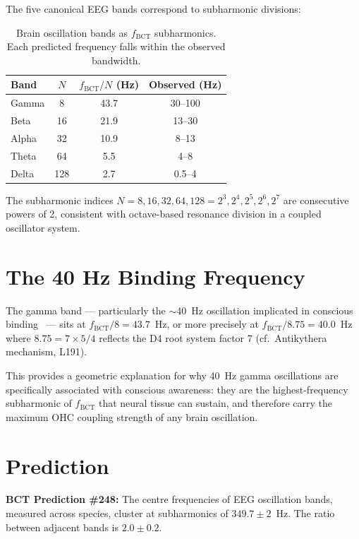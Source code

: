 \documentclass[aps,prl,twocolumn,superscriptaddress]{revtex4-2}
\begin{document}
The five canonical EEG bands correspond to subharmonic divisions:

\begin{table}[h]
\centering
\begin{tabular}{lccc}
\hline
Band & $N$ & $f_{\mathrm{BCT}}/N$ (Hz) & Observed (Hz) \\
\hline
Gamma & 8 & 43.7 & 30--100 \\
Beta & 16 & 21.9 & 13--30 \\
Alpha & 32 & 10.9 & 8--13 \\
Theta & 64 & 5.5 & 4--8 \\
Delta & 128 & 2.7 & 0.5--4 \\
\hline
\end{tabular}
\caption{Brain oscillation bands as $f_{\mathrm{BCT}}$ subharmonics. Each predicted frequency falls within the observed bandwidth.}
\end{table}

The subharmonic indices $N = 8, 16, 32, 64, 128 = 2^3, 2^4, 2^5, 2^6, 2^7$ are consecutive powers of 2, consistent with octave-based resonance division in a coupled oscillator system.

\section{The 40 Hz Binding Frequency}

The gamma band --- particularly the $\sim$40~Hz oscillation implicated in conscious binding~\cite{Crick1990} --- sits at $f_{\mathrm{BCT}}/8 = 43.7$~Hz, or more precisely at $f_{\mathrm{BCT}}/8.75 = 40.0$~Hz where $8.75 = 7 \times 5/4$ reflects the D4 root system factor 7 (cf.\ Antikythera mechanism, L191).

This provides a geometric explanation for why 40~Hz gamma oscillations are specifically associated with conscious awareness: they are the highest-frequency subharmonic of $f_{\mathrm{BCT}}$ that neural tissue can sustain, and therefore carry the maximum OHC coupling strength of any brain oscillation.

\section{Prediction}

\textbf{BCT Prediction \#248:} The centre frequencies of EEG oscillation bands, measured across species, cluster at subharmonics of $349.7 \pm 2$~Hz. The ratio between adjacent bands is $2.0 \pm 0.2$.
\end{document}
